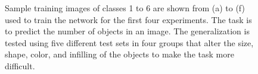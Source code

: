 \documentclass[letterpaper]{article} %
\begin{document}
\begin{figure}[!htbp] %
\centering 
\hspace{0.5pt}
\hspace{0.5pt}
\hspace{0.5pt}
\hspace{0.5pt}
\hspace{0.5pt}
\caption{Sample training images of classes 1 to 6 are shown from (a) to (f) used to train the network for the first four experiments. The task is to predict the number of objects in an image. The generalization is tested using five different test sets in four groups that alter the size, shape, color, and infilling of the objects to make the task more difficult.}
\label{fig:train}
\end{figure}
\end{document}
